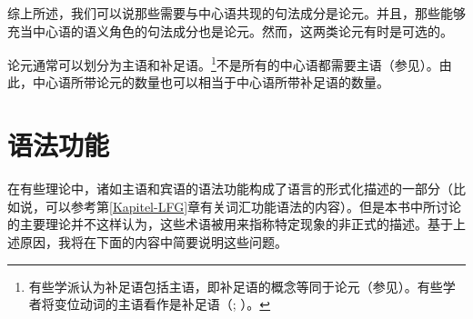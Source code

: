 综上所述，我们可以说那些需要与中心语共现的句法成分是论元。并且，那些能够充当中心语的语义角色的句法成分也是论元。然而，这两类论元有时是可选的。

论元通常可以划分为主语和补足语。\footnote{%
有些学派认为补足语包括主语，即补足语的概念等同于论元（参见\citet[]{Gross2003a}）。有些学者将变位动词的主语看作是补足语（\citealp{Pollard90a-Eng}; \citealp[]{Eisenberg94b}）。}不是所有的中心语都需要主语（参见\citet[\S~3.2]{MuellerLehrbuch1}）。由此，中心语所带论元的数量也可以相当于中心语所带补足语的数量。

\section{语法功能}
\label{Abschnitt-GF}
在有些理论中，诸如主语和宾语的语法功能构成了语言的形式化描述的一部分（比如说，可以参考第\ref{Kapitel-LFG}章有关词汇功能语法的内容）。但是本书中所讨论的主要理论并不这样认为，这些术语被用来指称特定现象的非正式的描述。基于上述原因，我将在下面的内容中简要说明这些问题。

